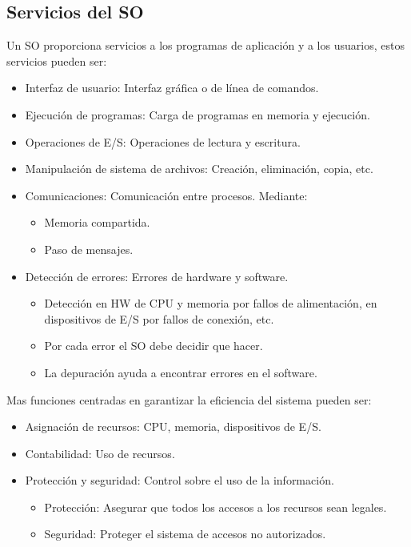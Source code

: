 \documentclass{templateNote}
\begin{document}
\subsection*{Servicios del SO}
Un SO proporciona servicios a los programas de aplicación y a los usuarios, estos servicios pueden ser:
\begin{itemize}
    \item Interfaz de usuario: Interfaz gráfica o de línea de comandos.
    \item Ejecución de programas: Carga de programas en memoria y ejecución.
    \item Operaciones de E/S: Operaciones de lectura y escritura.
    \item Manipulación de sistema de archivos: Creación, eliminación, copia, etc.
    \item Comunicaciones: Comunicación entre procesos. Mediante:
    \begin{itemize}
        \item Memoria compartida.
        \item Paso de mensajes.
    \end{itemize}
    \item Detección de errores: Errores de hardware y software.
    \begin{itemize}
        \item Detección en HW de CPU y memoria por fallos de alimentación, en dispositivos de E/S por fallos de conexión, etc.
        \item Por cada error el SO debe decidir que hacer.
        \item La depuración ayuda a encontrar errores en el software. 
    \end{itemize}
\end{itemize}
\noindent Mas funciones centradas en garantizar la eficiencia del sistema pueden ser:
\begin{itemize}
    \item Asignación de recursos: CPU, memoria, dispositivos de E/S.
    \item Contabilidad: Uso de recursos.
    \item Protección y seguridad: Control sobre el uso de la información.
    \begin{itemize}
        \item Protección: Asegurar que todos los accesos a los recursos sean legales.
        \item Seguridad: Proteger el sistema de accesos no autorizados.
    \end{itemize}
\end{itemize}
\end{document}
